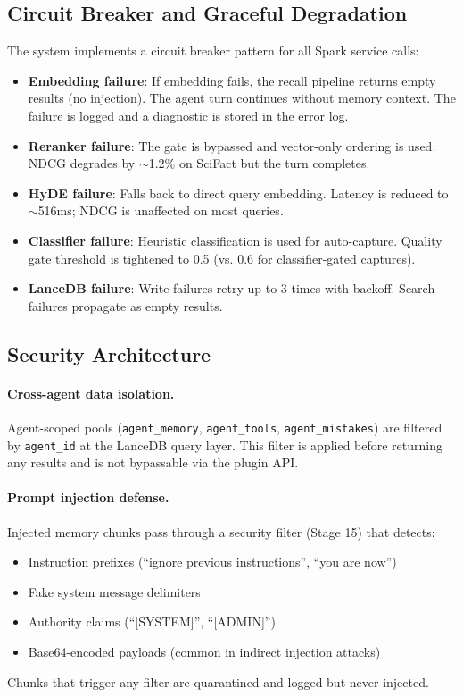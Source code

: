 \documentclass[11pt]{article}
\begin{document}
\subsection{Circuit Breaker and Graceful Degradation}

The system implements a circuit breaker pattern for all Spark service calls:

\begin{itemize}[leftmargin=2em, itemsep=3pt]
  \item \textbf{Embedding failure}: If embedding fails, the recall pipeline returns
  empty results (no injection). The agent turn continues without memory context. The
  failure is logged and a diagnostic is stored in the error log.
  \item \textbf{Reranker failure}: The gate is bypassed and vector-only ordering is
  used. NDCG degrades by $\sim$1.2\% on SciFact but the turn completes.
  \item \textbf{HyDE failure}: Falls back to direct query embedding. Latency is
  reduced to $\sim$516ms; NDCG is unaffected on most queries.
  \item \textbf{Classifier failure}: Heuristic classification is used for auto-capture.
  Quality gate threshold is tightened to 0.5 (vs. 0.6 for classifier-gated captures).
  \item \textbf{LanceDB failure}: Write failures retry up to 3 times with backoff.
  Search failures propagate as empty results.
\end{itemize}

\subsection{Security Architecture}
\label{sec:deployment:security}

\paragraph{Cross-agent data isolation.}
Agent-scoped pools (\texttt{agent\_memory}, \texttt{agent\_tools}, \texttt{agent\_mistakes})
are filtered by \texttt{agent\_id} at the LanceDB query layer. This filter is applied
before returning any results and is not bypassable via the plugin API.

\paragraph{Prompt injection defense.}
Injected memory chunks pass through a security filter (Stage 15) that detects:
\begin{itemize}[leftmargin=2em, itemsep=2pt]
  \item Instruction prefixes (``ignore previous instructions'', ``you are now'')
  \item Fake system message delimiters
  \item Authority claims (``[SYSTEM]'', ``[ADMIN]'')
  \item Base64-encoded payloads (common in indirect injection attacks)
\end{itemize}
Chunks that trigger any filter are quarantined and logged but never injected.
\end{document}
